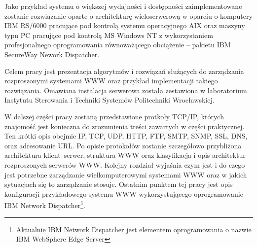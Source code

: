 Jako przykład systemu o większej wydajności i dostępności zaimplementowane zostanie rozwiązanie oparte o architekturę 
wieloserwerową w oparciu o komputery IBM RS/6000 pracujące pod kontrolą systemu operacyjnego AIX oraz maszyny typu PC
pracujące pod kontrolą MS Windows NT z wykorzystaniem profesjonalnego oprogramowania równoważącego obciążenie -- pakietu
IBM SecureWay Nework Dispatcher. 

Celem pracy jest prezentacja algorytmów i rozwiązań służących do zarządzania rozproszonymi 
systemami WWW oraz przykład implementacji takiego rozwiązania. 
Omawiana instalacja serwerowa została zestawiona w laboratorium Instytutu Sterowania i Techniki Systemów 
Politechniki Wrocławskiej. 

W dalszej części pracy zostaną przedstawione protkoły TCP/IP, których znajomość jest konieczna do zrozumienia treści zawartych 
w części praktycznej. Ten krótki opis obejmie IP, TCP, UDP, HTTP, FTP, SMTP, SNMP, SSL, DNS, oraz adresowanie URL. Po opisie 
protokołów zostanie szczegółowo przybliżona architektura klient--serwer, struktura WWW oraz klasyfikacja i opis architektur
rozproszonych serwerów WWW. Kolejny rozdział wyjaśnia czym jest i do czego jest potrzebne zarządzanie wielkomputerowymi 
systemami WWW oraz w jakich sytuacjach się to zarządzanie stosuje. Ostatnim punktem tej pracy jest opis konfiguracji 
przykładowego systemu WWW wykorzystującego oprogramowanie IBM Network Dispatcher\footnote{Aktualnie IBM Network Dispatcher jest elementem oprogramowania o nazwie IBM WebSphere Edge Server}.
